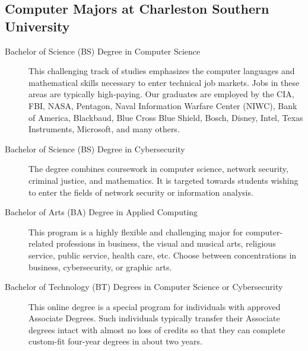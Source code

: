 \subsection{Computer Majors at Charleston Southern University}
\begin{description}

	\item[Bachelor of Science (BS) Degree in Computer Science] This challenging track of studies emphasizes the computer languages and mathematical skills necessary to enter technical job markets. Jobs in these areas are typically high-paying. Our graduates are employed by the CIA, FBI, NASA, Pentagon, Naval Information Warfare Center (NIWC), Bank of America, Blackbaud, Blue Cross Blue Shield, Bosch, Disney, Intel, Texas Instruments, Microsoft, and many others.
	\item[Bachelor of Science (BS) Degree in Cybersecurity] The degree combines coursework in computer science, network security, criminal justice, and mathematics. It is targeted towards students wishing to enter the fields of network security or information analysis.
		\item[Bachelor of Arts (BA) Degree in Applied Computing] This program is a highly flexible and challenging major for computer-related professions in business, the visual and musical arts, religious service, public service, health care, etc. Choose between concentrations in business, cybersecurity, or graphic arts.
		\item[Bachelor of Technology (BT) Degrees in Computer Science or Cybersecurity] This online degree is a special program for individuals with approved Associate Degrees. Such individuals typically transfer their Associate degrees intact with almost no loss of credits so that they can complete custom-fit four-year degrees in about two years.\vspace{0.5em}
\end{description}

